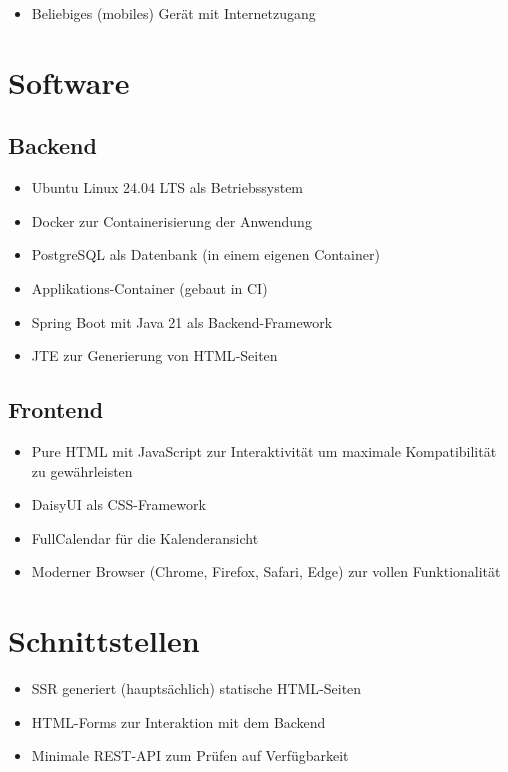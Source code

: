 \begin{itemize}
    \item Beliebiges (mobiles) Gerät mit Internetzugang
\end{itemize}

\section{Software}

\subsection{Backend}

\begin{itemize}
    \item Ubuntu Linux 24.04 LTS als Betriebssystem
    \item \gls{Docker} zur \gls{Container}isierung der Anwendung
    \item \gls{PostgreSQL} als Datenbank (in einem eigenen \gls{Container})
    \item Applikations-\gls{Container} (gebaut in \gls{CI})
    \item Spring Boot mit Java 21 als Backend-Framework
    \item JTE zur Generierung von \gls{HTML}-Seiten
\end{itemize}

\subsection{Frontend}

\begin{itemize}
    \item Pure \gls{HTML} mit \gls{JavaScript} zur Interaktivität um maximale Kompatibilität zu gewährleisten
    \item DaisyUI als \gls{CSS}-Framework
    \item FullCalendar für die Kalenderansicht
    \item Moderner \gls{Browser} (Chrome, Firefox, Safari, Edge) zur vollen Funktionalität
\end{itemize}

\section{Schnittstellen}

\begin{itemize}
    \item \gls{SSR} generiert (hauptsächlich) statische \gls{HTML}-Seiten
    \item \gls{HTML}-Forms zur Interaktion mit dem Backend
    \item Minimale \gls{REST}-\gls{API} zum Prüfen auf Verfügbarkeit
\end{itemize}